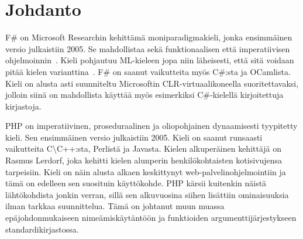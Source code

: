 \section{Johdanto}
F\# on Microsoft Researchin kehittämä moniparadigmakieli, jonka ensimmäinen versio julkaistiin 2005. Se mahdollistaa sekä funktionaalisen että imperatiivisen ohjelmoinnin~\cite{wiki_fs_programming}. Kieli pohjautuu ML-kieleen jopa niin läheisesti, että sitä voidaan pitää kielen varianttina~\cite{wiki_ml}. F\# on saanut vaikutteita myös C\#:sta ja OCamlista. Kieli on alusta asti suunniteltu Microsoftin CLR-virtuaalikoneella suoritettavaksi, jolloin siinä on mahdollista käyttää myös esimerkiksi C\#-kielellä kirjoitettuja kirjastoja.
\par
PHP on imperatiivinen, proseduraalinen ja oliopohjainen dynaamisesti tyypitetty kieli. Sen ensimmäinen versio julkaistiin 2005. Kieli on saanut runsaasti vaikutteita C\textbackslash C++:sta, Perlistä ja Javasta. Kielen alkuperäinen kehittäjä on Rasmus Lerdorf, joka kehitti kielen alunperin henkilökohtaisten kotisivujensa tarpeisiin. Kieli on näin alusta alkaen keskittynyt web-palvelinohjelmointiin ja tämä on edelleen sen suosituin käyttökohde. PHP kärsii kuitenkin näistä lähtökohdista jonkin verran, sillä sen alkuvuosina siihen lisättiin ominaisuuksia ilman tarkkaa suunnittelua. Tämä on johtanut muun muassa epäjohdonmukaiseen nimeämiskäytäntöön ja funktioiden argumenttijärjestykseen standardikirjastossa.